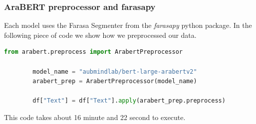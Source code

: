 \documentclass[12pt]{diazessay}
\begin{document}
        \subsubsection{AraBERT preprocessor and farasapy}
        Each model uses the Farasa Segmenter\cite{Farasa} from the \emph{farasapy} python package. In the following piece of code we show how we preprocessed our data.
        \begin{lstlisting}[language=Python]
        from arabert.preprocess import ArabertPreprocessor
        
        model_name = "aubmindlab/bert-large-arabertv2"
        arabert_prep = ArabertPreprocessor(model_name)
        
        df["Text"] = df["Text"].apply(arabert_prep.preprocess)
        \end{lstlisting}
        This code takes about 16 minute and 22 second to execute.
        
\end{document}
